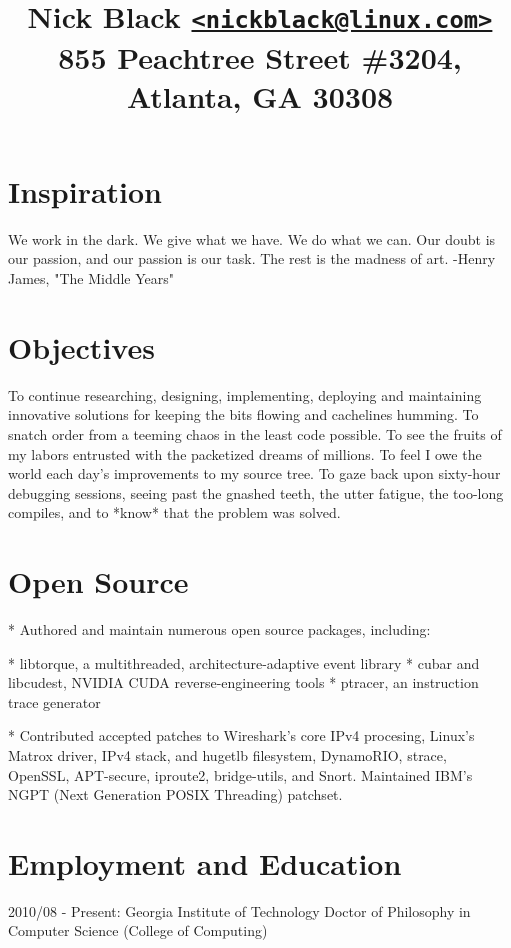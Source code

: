 \documentclass{article}
\author{}
\title{
\bf\Large{Nick Black \href{mailto:nickblack@linux.com}{\nolinkurl{<nickblack@linux.com>}}}\\
\bf\Large{855 Peachtree Street \#3204, Atlanta, GA 30308}
}
\date{}
\begin{document}
\maketitle
\section{Inspiration}

We work in the dark. We give what we have. We do what we can.
Our doubt is our passion, and our passion is our task.
The rest is the madness of art. -Henry James, "The Middle Years"

\section{Objectives}

To continue researching, designing, implementing, deploying and maintaining
innovative solutions for keeping the bits flowing and cachelines humming.
To snatch order from a teeming chaos in the least code possible. To see the
fruits of my labors entrusted with the packetized dreams of millions. To feel I
owe the world each day's improvements to my source tree. To gaze back upon
sixty-hour debugging sessions, seeing past the gnashed teeth, the utter
fatigue, the too-long compiles, and to *know* that the problem was solved.

\section{Open Source}

* Authored and maintain numerous open source packages, including:

 * libtorque, a multithreaded, architecture-adaptive event library
 * cubar and libcudest, NVIDIA CUDA reverse-engineering tools
 * ptracer, an instruction trace generator

* Contributed accepted patches to Wireshark's core IPv4 procesing, Linux's
  Matrox driver, IPv4 stack, and hugetlb filesystem, DynamoRIO,
  strace, OpenSSL, APT-secure, iproute2, bridge-utils, and Snort.
  Maintained IBM's NGPT (Next Generation POSIX Threading) patchset.

\section{Employment and Education}

2010/08 - Present: Georgia Institute of Technology
Doctor of Philosophy in Computer Science (College of Computing)
\end{document}
